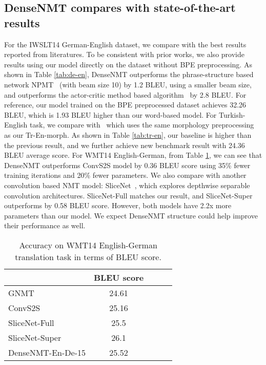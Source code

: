 \documentclass[11pt,a4paper]{article}
\begin{document}
\subsection{DenseNMT compares with state-of-the-art results}
For the IWSLT14 German-English dataset, we compare with the best results reported from literatures. To be consistent with prior works, we also provide results using our model directly on the dataset without BPE preprocessing. As shown in Table \ref{tab:de-en}, DenseNMT outperforms the phrase-structure based network NPMT~\cite{msrphrase} (with beam size 10) by 1.2 BLEU, using a smaller beam size, and outperforms the actor-critic method based algorithm~\cite{bahdanau2016actor} by 2.8 BLEU. For reference, our model trained on the BPE preprocessed dataset achieves 32.26 BLEU, which is 1.93 BLEU higher than our word-based model. 
For Turkish-English task, we compare with~\cite{gulcehre2015using} which uses the same morphology preprocessing as our Tr-En-morph. As shown in Table \ref{tab:tr-en}, our baseline is higher than the previous result, and we further achieve new benchmark result with 24.36 BLEU average score.
For WMT14 English-German, from Table \ref{tab:en-de}, we can see that DenseNMT outperforms ConvS2S model by 0.36 BLEU score using 35\% fewer training iterations and 20\% fewer parameters. We also compare with another convolution based NMT model: SliceNet~\cite{slicenet}, which explores depthwise separable convolution architectures. SliceNet-Full matches our result, and SliceNet-Super outperforms by 0.58 BLEU score. However, both models have 2.2x more parameters than our model. We expect DenseNMT structure could help improve their performance as well. 



\begin{table}[htbp]
\centering
\small
\captionsetup{font=small}
\begin{tabular}{lcccc}
\toprule
 & \textbf{BLEU score}\\
\midrule
GNMT {\tiny~\cite{gnmt}} & 24.61 \\
ConvS2S {\tiny~\cite{convs2s}} & 25.16  \\
SliceNet-Full {\tiny~\cite{slicenet}} & 25.5  \\
SliceNet-Super {\tiny~\cite{slicenet}} & 26.1  \\
\midrule
DenseNMT-En-De-15 & 25.52   \\
\bottomrule
\end{tabular}
\caption{Accuracy on WMT14 English-German translation task in terms of BLEU score.}
\label{tab:en-de}
\end{table}
\end{document}
